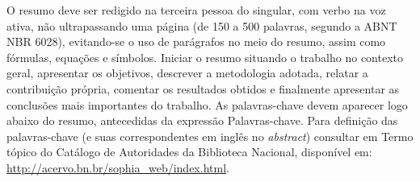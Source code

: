 
\begin{resumoutfpr}%
O resumo deve ser redigido na terceira pessoa do singular, com verbo na voz ativa, não ultrapassando uma página (de 150 a 500 palavras, segundo a ABNT NBR 6028), evitando-se o uso de parágrafos no meio do resumo, assim como fórmulas, equações e símbolos. Iniciar o resumo situando o trabalho no contexto geral, apresentar os objetivos, descrever a metodologia adotada, relatar a contribuição própria, comentar os resultados obtidos e finalmente apresentar as conclusões mais importantes do trabalho. As palavras-chave devem aparecer logo abaixo do resumo, antecedidas da expressão Palavras-chave. Para definição das palavras-chave (e suas correspondentes em inglês no \textit{abstract}) consultar em Termo tópico do Catálogo de Autoridades da Biblioteca Nacional, disponível em: \url{http://acervo.bn.br/sophia_web/index.html}.
\end{resumoutfpr}
